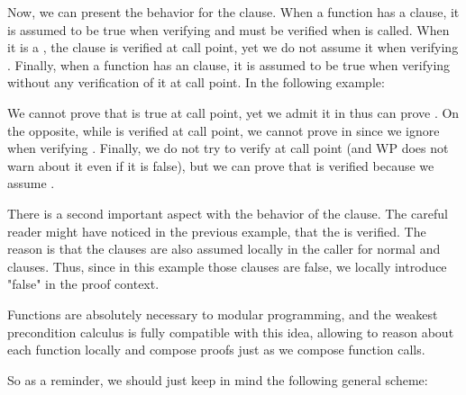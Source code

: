Now, we can present the behavior for the  clause. When a
function  has a  clause, it is assumed to be
true when verifying  and must be verified when  is
called. When it is a , the clause is verified at
call point, yet we do not assume it when verifying . Finally, when
a function  has an  clause, it is
assumed to be true when verifying  without any verification of it
at call point. In the following example:



We cannot prove that  is true at call point, yet we admit it in
 thus can prove . On the opposite, while
 is verified at call point, we cannot prove  in
 since we ignore  when verifying .
Finally, we do not try to verify  at call point (and WP does not
warn about it even if it is false), but we can prove that  is
verified because we assume .


There is a second important aspect with the behavior of the 
clause. The careful reader might have noticed in the previous example, that the
 is verified. The reason is that the
 clauses are also assumed locally in the caller for normal
and   clauses. Thus, since in this
example those  clauses are false, we locally introduce
"false" in the proof context.





Functions are absolutely necessary to modular programming, and the weakest
precondition calculus is fully compatible with this idea, allowing to reason
about each function locally and compose proofs just as we compose function
calls.


So as a reminder, we should just keep in mind the following general scheme:


